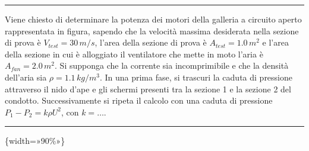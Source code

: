 \documentclass[letterpaper,10pt,italian]{jupyterBook}
\begin{document}
\bigskip\hrule\bigskip


\sphinxAtStartPar
Viene chiesto di determinare la potenza dei motori della galleria a circuito aperto rappresentata in figura, sapendo che la velocità massima desiderata nella sezione di prova è \(V_{test} = 30 \, m/s\), l’area della sezione di prova è \(A_{test} = 1.0 \, m^2\) e l’area della sezione in cui è alloggiato il ventilatore che mette in moto l’aria è \(A_{fan} = 2.0 \, m^2\). Si supponga che la corrente sia incomprimibile e che la densità dell’aria sia \(\rho = 1.1 \, kg/m^3\). In una prima fase, si trascuri la caduta di pressione attraverso il nido d’ape e gli schermi presenti tra la sezione 1 e la sezione 2 del condotto. Successivamente si ripeta il calcolo con una caduta di pressione \(P_1 - P_2 = k \rho U^2\), con \(k = \dots\).


\bigskip\hrule\bigskip


\sphinxAtStartPar
{}\{width=»90\%»\}
\end{document}
